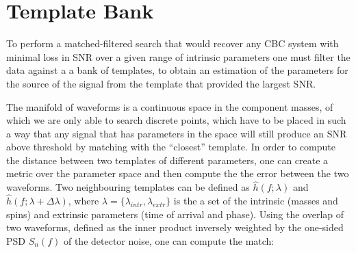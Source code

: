 \documentclass[binding=0.6cm, LaM]{sapthesis}
\begin{document}
%
%	
%	
%
%
%
%
%

\section{Template Bank}


	To perform a matched-filtered search that would recover any CBC system 	
	with minimal loss in SNR over a given range of intrinsic parameters 
	one must filter the data against a a bank of templates, 
	to obtain an estimation of the parameters for the source of the signal 
	from the template that provided the largest SNR.
	

	The manifold of waveforms is a continuous space in the component masses, 
	of which we are only able to search discrete points, 
	which have to be placed in such a way that any signal
	that has parameters in the space will still produce an SNR 
	above threshold by matching with the “closest” template. 
	In order to compute the distance between two templates of different parameters, 
	one can create a metric over the parameter space and then compute the the error between the two waveforms.
	Two neighbouring templates can be defined as $\hat h(f;\lambda)$ and $\hat h(f;\lambda + \Delta \lambda)$,
	where $\lambda = \{\lambda_{intr}, \lambda_{extr}\}$ is the a set of 
	the intrinsic (masses and spins) and extrinsic parameters (time of arrival and phase).
	Using the overlap of two waveforms, defined as the inner product inversely weighted 
	by the one-sided PSD $S_n(f)$ of the detector noise, one can compute the match:
\end{document}
